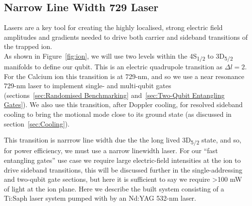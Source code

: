 \documentclass[12pt]{report}
\begin{document}

\subsection{Narrow Line Width 729 Laser}
\label{sec:Narrow Line Width 729 Laser} 

    Lasers are a key tool for creating the highly localised, strong electric
    field amplitudes and gradients needed to drive both carrier and sideband
    transitions of the trapped ion.\\ As shown in Figure~\ref{fig:ion}, we will
    use two levels within the 4S\textsubscript{1/2} to 3D\textsubscript{5/2}
    manifolds to define our qubit. This is an electric quadrupole transition as
    $\Delta l = 2$.  For the Calcium ion this transition is at 729-nm, and so we
    use a near resonance 729-nm laser to implement single- and multi-qubit gates
    (sections~\ref{sec:Randomised Benchmarking} and~\ref{sec:Two-Qubit
    Entangling Gates}). We also use this transition, after Doppler cooling, for
    resolved sideband cooling to bring the motional mode close to its ground
    state (as discussed in section~\ref{sec:Cooling}).

    This transition is narrrow line width due the the long lived
    3D\textsubscript{5/2} state, and so, for power efficiency, we must use a
    narrow linewidth laser. For our ``fast entangling gates'' use case we
    require large electric-field intensities at the ion to drive sideband
    transitions, this will be discussed further in the single-addressing and
    two-qubit gate sections, but here it is sufficient to say we require >100 mW
    of light at the ion plane.  Here we describe the built system 
    consisting of a Ti:Saph laser system pumped with by an Nd:YAG 532-nm laser.\\
\end{document}
